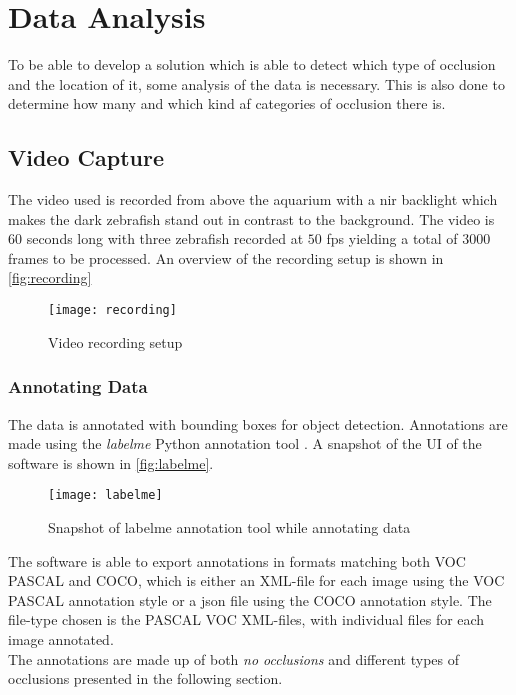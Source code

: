 \graphicspath{{figures/analysis/}}
\chapter{Data Analysis}\label{ch:data_anal}
To be able to develop a solution which is able to detect which type of occlusion and the location of it, some analysis of the data is necessary. This is also done to determine how many and which kind af categories of occlusion there is.

\section{Video Capture}
The video used is recorded from above the aquarium with a \gls{nir} backlight which makes the dark zebrafish stand out in contrast to the background. The video is $ 60 $ seconds long with three zebrafish recorded at $ 50 $ \gls{fps} yielding a total of $3000$ frames to be processed. An overview of the recording setup is shown in \autoref{fig:recording}

\begin{figure}[H]
	\centering
	\texttt{[image: recording]}
	\caption{Video recording setup}
	\label{fig:recording}
\end{figure}

\subsection{Annotating Data}
The data is annotated with bounding boxes for object detection. Annotations are made using the \textit{labelme} Python annotation tool \citep{labelme2016}. A snapshot of the UI of the software is shown in \autoref{fig:labelme}.

\begin{figure}[H]
	\centering
	\texttt{[image: labelme]}
	\caption{Snapshot of labelme annotation tool while annotating data}
	\label{fig:labelme}
\end{figure}

The software is able to export annotations in formats matching both VOC PASCAL and COCO, which is either an XML-file for each image using the VOC PASCAL annotation style or a json file using the COCO annotation style. The file-type chosen is the PASCAL VOC XML-files, with individual files for each image annotated.\\

The annotations are made up of both \textit{no occlusions} and different types of occlusions presented in the following section.

